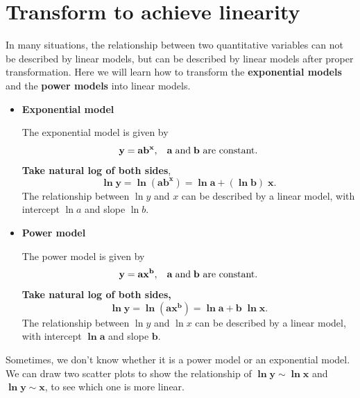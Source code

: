 \documentclass[a4paper, 12pt,twoside]{book}
\begin{document}
\newpage






\section{Transform to achieve linearity}

In many situations, the relationship between two quantitative variables can not be described by linear models, but can be described by linear models after proper transformation. Here we will learn how to transform the \textbf{exponential models} and the \textbf{power models} into linear models.\vspace{0.3cm}

\begin{itemize}
 \item \textbf{Exponential model} \vspace{0.3cm}
 
 The exponential model is given by $$\mathbf{y=ab^x, \hspace{0.3cm} a\; \text{and}\; b \text{ are constant}.}$$ 
 \textbf{Take natural log of both sides},$$\mathbf{\ln y = \ln(ab^x) = \ln a + (\ln b)\; x}.$$
The relationship between $\ln y $ and $x$ can be described by a linear model, with intercept $\ln a$ and slope $\ln b$.
\vspace{0.6cm}

\item \textbf{Power model}\vspace{0.3cm}

The power model is given by
$$\mathbf{y=ax^b, \hspace{0.3cm} a\; \text{and}\; b \text{ are constant}.}$$ 
\textbf{Take natural log of both sides,} $$\mathbf{\ln y = \ln(ax^b) = \ln a +  b\;\ln x}.$$
The relationship between $\ln y $  and $\ln x $ can be described by a linear model, with intercept $\mathbf{\ln a}$ and slope $\mathbf{b}$.
\end{itemize}
\vspace{0.6cm}
\colorbox{babypink}{\parbox{\textwidth}{
Sometimes, we don't know whether it is a power model or an exponential model. We can draw two scatter plots to show the relationship of $\mathbf{\ln y \sim \ln x} $ and $\mathbf{\ln y \sim x}$, to see which one
 is more linear.
}} \vspace{0.6cm}

 \newpage
 
\end{document}
